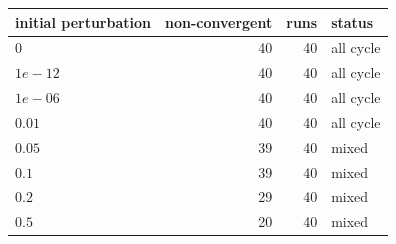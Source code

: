 \begin{tabular}{l rr l}
\toprule
initial perturbation & non-convergent & runs & status \\
\midrule
$0$ & 40 & 40 & all cycle \\
$1e-12$ & 40 & 40 & all cycle \\
$1e-06$ & 40 & 40 & all cycle \\
$0.01$ & 40 & 40 & all cycle \\
$0.05$ & 39 & 40 & mixed \\
$0.1$ & 39 & 40 & mixed \\
$0.2$ & 29 & 40 & mixed \\
$0.5$ & 20 & 40 & mixed \\
\bottomrule
\end{tabular}
